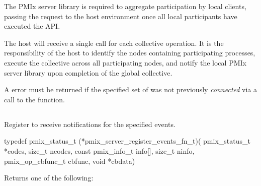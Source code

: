 \adviceimplstart
The \ac{PMIx} server library is required to aggregate participation by local clients, passing the request to the host environment once all local participants have executed the \ac{API}.
\adviceimplend

\advicermstart
The host will receive a single call for each collective operation. It is the responsibility of the host to identify the nodes containing participating processes, execute the collective across all participating nodes, and notify the local \ac{PMIx} server library upon completion of the global collective.

A  error must be returned if the specified set of  was not previously \textit{connected} via a call to the  function.
\advicermend


\subsection{}

\summary

Register to receive notifications for the specified events.

\format

\cspecificstart
\begin{codepar}
 typedef pmix_status_t (*pmix_server_register_events_fn_t)(
                              pmix_status_t *codes,
                              size_t ncodes,
                              const pmix_info_t info[],
                              size_t ninfo,
                              pmix_op_cbfunc_t cbfunc,
                              void *cbdata)
\end{codepar}
\cspecificend

\begin{arglist}
\end{arglist}

Returns one of the following:

